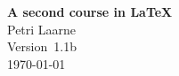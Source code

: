 \documentclass[a4paper, 11pt]{report}
\begin{document}
\begin{titlepage}

\hrulefill

\begin{flushright}
\textbf{\LARGE A second course in \LaTeX}\\[1em]
\Large Petri Laarne\\[1em]
Version~1.1b\\
\today
\end{flushright}

\hrulefill

\end{titlepage}

\tableofcontents













\printindex
\printbibliography[heading=bibintoc]


\end{document}
